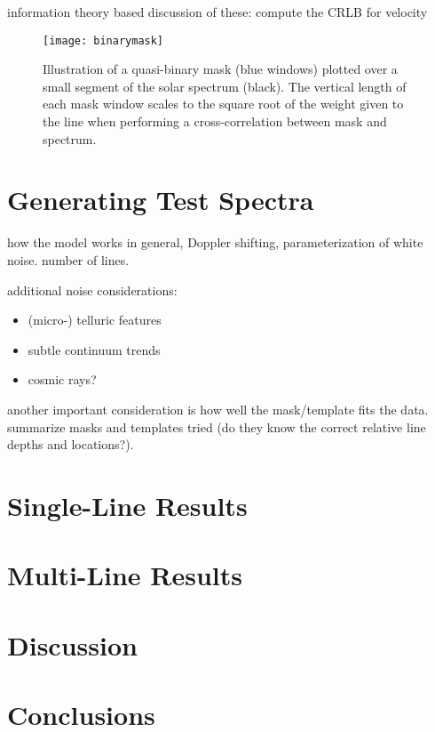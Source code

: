 \documentclass[modern]{aastex61}
\begin{document}
information theory based discussion of these: compute the CRLB for velocity

\begin{figure}
\centering
\texttt{[image: binarymask]}
\caption{Illustration of a quasi-binary mask (blue windows) plotted over a small segment of the solar spectrum (black). The vertical length of each mask window scales to the square root of the weight given to the line when performing a cross-correlation between mask and spectrum.}
\label{fig:binarymask}
\end{figure}


\section{Generating Test Spectra}

how the model works in general, Doppler shifting, parameterization of white noise. number of lines.

additional noise considerations:
\begin{itemize}
\item (micro-) telluric features
\item subtle continuum trends
\item cosmic rays?
\end{itemize}

another important consideration is how well the mask/template fits the data. summarize masks and templates tried (do they know the correct relative line depths and locations?).

\section{Single-Line Results}

\section{Multi-Line Results}

\section{Discussion}

\section{Conclusions}

\acknowledgements


\end{document}
